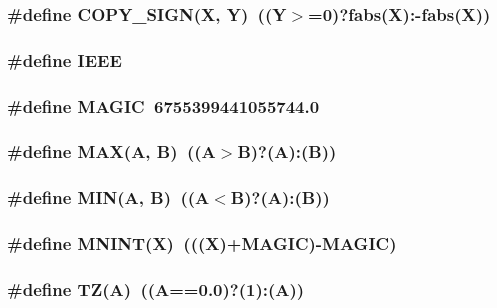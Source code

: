 \subsubsection{\setlength{\rightskip}{0pt plus 5cm}\#define COPY\_\-SIGN(X, Y)~((Y$>$=0)?fabs(X):-fabs(X))}\label{md__macros_8h_2e53a83c391639fbade4bd527a8b93d0}


\subsubsection{\setlength{\rightskip}{0pt plus 5cm}\#define IEEE}\label{md__macros_8h_a7930e33c57bab29f34a2b6e20369a48}


\subsubsection{\setlength{\rightskip}{0pt plus 5cm}\#define MAGIC~6755399441055744.0}\label{md__macros_8h_94630370ae389fb1189282fa0742f310}


\subsubsection{\setlength{\rightskip}{0pt plus 5cm}\#define MAX(A, B)~((A$>$B)?(A):(B))}\label{md__macros_8h_d935f1ff1a50822e317bdb321ce991ad}


\subsubsection{\setlength{\rightskip}{0pt plus 5cm}\#define MIN(A, B)~((A$<$B)?(A):(B))}\label{md__macros_8h_dcd021ac91d43a62b2cdecf9a5b971a7}


\subsubsection{\setlength{\rightskip}{0pt plus 5cm}\#define MNINT(X)~(((X)+MAGIC)-MAGIC)}\label{md__macros_8h_4fa54e763a15e07e4a568ae9913a5be1}


\subsubsection{\setlength{\rightskip}{0pt plus 5cm}\#define TZ(A)~((A==0.0)?(1):(A))}\label{md__macros_8h_813c00f9f7ed20ecc767c453e9fabfe0}


